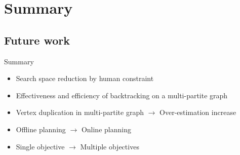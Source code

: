 \section{Summary}

\subsection*{Future work}

\begin{frame}{Summary}

  \begin{itemize}
  \item Search space reduction by \alert{human constraint}
  \item Effectiveness and efficiency of \alert{backtracking} on a multi-partite graph
  \end{itemize}

\bigskip
\bigskip
 
  \begin{itemize}
  \item Vertex duplication in multi-partite graph $ \rightarrow $ Over-estimation increase 
  \item Offline planning $ \rightarrow $ Online planning
  \item Single objective $ \rightarrow $ Multiple objectives
  \end{itemize}

\end{frame}